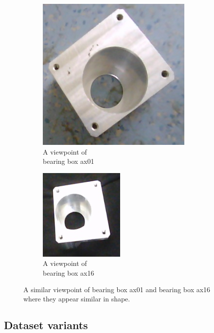 \begin{itemize}
\begin{figure}
	\centering
	\begin{subfigure}{.3\textwidth}
  		\centering
  		\includegraphics[width=.5\linewidth]{images/ax01_similar}
  		\caption{A viewpoint of \\bearing box ax01}
  		\label{Fig:sim2a}
	\end{subfigure}%
	\begin{subfigure}{.3\textwidth}
  		\centering
  		\includegraphics[width=.5\linewidth]{images/ax16_similar}
  		\caption{A viewpoint of \\bearing box ax16}
  		\label{Fig:sim2b}
	\end{subfigure}%
	\caption{A similar viewpoint of bearing box ax01 and bearing box ax16 where they appear similar in shape.}
	\label{Fig:sim2}
\end{figure}	
	\end{itemize}
	
	\subsection{Dataset variants}
	
